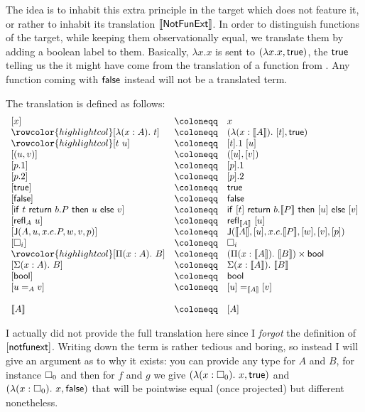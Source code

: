 The idea is to inhabit this extra principle in the target which does not feature
it, or rather to inhabit its translation \(\llbracket \mathsf{NotFunExt} \rrbracket\).
In order to distinguish functions of the target, while keeping them
observationally equal, we translate them by adding a boolean label to them.
Basically, \(\lambda x. x\) is sent to \((\lambda x. x, \mathsf{true})\), the
\(\mathsf{true}\) telling us the it might have come from the translation of a function
from \cS.
Any function coming with \(\mathsf{false}\) instead will not be a translated term.

The translation is defined as follows:
%
\[
\begin{array}{lcl}
  [ x ] &\coloneqq& x \\
  \rowcolor{highlightcol} \relax
  [ \lambda (x : A).\ t ] &\coloneqq& (\lambda (x : \transl{A}).\ [t],\ttrue) \\
  \rowcolor{highlightcol} \relax
  [ t\ u ] &\coloneqq& [t].1\ [u] \\ \relax
  [ (u, v) ] &\coloneqq& ([u], [v]) \\ \relax
  [ p.1 ] &\coloneqq& [p].1 \\ \relax
  [ p.2 ] &\coloneqq& [p].2 \\ \relax
  [ \ttrue ] &\coloneqq& \ttrue \\ \relax
  [ \ffalse ] &\coloneqq& \ffalse \\ \relax
  [ \tif{t}{b. P}{u}{v} ] &\coloneqq& \tif{[t]}{b. \transl{P}}{[u]}{[v]} \\
  \relax
  [ \refl{A} u ] &\coloneqq& \refl{\transl{A}} [u] \\ \relax
  [ \J{A}{u}{x.e.P}{w}{v}{p} ] &\coloneqq&
  \J{\transl{A}}{[u]}{x.e.\transl{P}}{[w]}{[v]}{[p]} \\ \relax
  [ \Ty{i} ] &\coloneqq& \Ty{i} \\
  \rowcolor{highlightcol} \relax
  [ \Pi (x : A).\ B ] &\coloneqq&
  (\Pi (x : \transl{A}).\ \transl{B}) \times \bool \\ \relax
  [ \Sigma (x : A).\ B ] &\coloneqq& \Sigma (x:\transl{A}).\ \transl{B} \\
  \relax
  [ \bool ] &\coloneqq& \bool \\ \relax
  [ u =_A v ] &\coloneqq& [u] =_{\transl{A}} [v] \\ \relax
  \\
  \transl{A} &\coloneqq& [A]
\end{array}
\]

I actually did not provide the full translation here since I \emph{forgot}
the definition of \([\mathsf{notfunext}]\).
Writing down the term is rather tedious and boring, so instead I will give an
argument as to why it exists: you can provide any type for \(A\) and \(B\), for
instance \(\square_{0}\) and then for \(f\) and \(g\) we give
\((\lambda (x:\square_{0}).\ x, \mathsf{true})\) and
\((\lambda (x:\square_{0}).\ x, \mathsf{false})\) that will be pointwise equal (once
projected) but different nonetheless.

